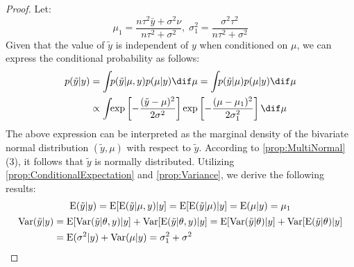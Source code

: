 \begin{proof}
	Let:
	\begin{equation*}
		\mu_1=\frac{n\tau^2\bar{y}+\sigma^2\nu}{n\tau^2+\sigma^2},\;\sigma^2_1=\frac{\sigma^2\tau^2}{n\tau^2+\sigma^2}
	\end{equation*}
	Given that the value of $\tilde{y}$ is independent of $y$ when conditioned on $\mu$, we can express the conditional probability as follows:
	\begin{align*}
		p(\tilde{y}|y)
		&=\int_{}p(\tilde{y}|\mu,y)p(\mu|y)\dif\mu=\int_{}p(\tilde{y}|\mu)p(\mu|y)\dif\mu \\
		&\propto\int_{}\exp\left[-\frac{(\tilde{y}-\mu)^2}{2\sigma^2}\right]\exp\left[-\frac{(\mu-\mu_1)^2}{2\sigma_1^2}\right]\dif\mu	
	\end{align*}
	The above expression can be interpreted as the marginal density of the bivariate normal distribution $(\tilde{y}, \mu)$ with respect to $\tilde{y}$. According to \cref{prop:MultiNormal}(3), it follows that $\tilde{y}$ is normally distributed. Utilizing \cref{prop:ConditionalExpectation} and \cref{prop:Variance}, we derive the following results:
	\begin{gather*}
		\operatorname{E}(\tilde{y}|y)=\operatorname{E}[\operatorname{E}(\tilde{y}|\mu,y)|y]=\operatorname{E}[\operatorname{E}(\tilde{y}|\mu)|y]=\operatorname{E}(\mu|y)=\mu_1 \\
		\begin{aligned}
			\operatorname{Var}(\tilde{y}|y)&=\operatorname{E}[\operatorname{Var}(\tilde{y}|\theta,y)|y]+\operatorname{Var}[\operatorname{E}(\tilde{y}|\theta,y)|y]=\operatorname{E}[\operatorname{Var}(\tilde{y}|\theta)|y]+\operatorname{Var}[\operatorname{E}(\tilde{y}|\theta)|y] \\
			&=\operatorname{E}(\sigma^2|y)+\operatorname{Var}(\mu|y)=\sigma_1^2+\sigma^2
		\end{aligned}\qedhere
	\end{gather*}
\end{proof}
